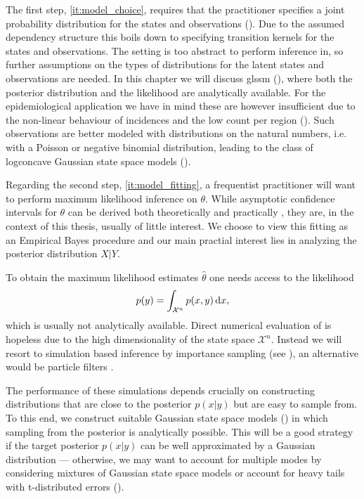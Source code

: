 The first step, \cref{it:model_choice}, requires that the practitioner specifies a joint probability distribution for the states and observations ().
Due to the assumed dependency structure this boils down to specifying transition kernels for the states and observations.
The setting  is too abstract to perform inference in, so further assumptions on the types of distributions for the latent states and observations are needed.
In this chapter we will discuss \gls{glssm}  (), where both the posterior distribution and the likelihood are analytically available. For the epidemiological application we have in mind these are however insufficient due to the non-linear behaviour of incidences and the low count per region ().
Such observations are better modeled with distributions on the natural numbers, i.e. with a Poisson or negative binomial distribution, leading to the class of logconcave Gaussian state space models ().

Regarding the second step, \cref{it:model_fitting}, a frequentist practitioner will want to perform maximum likelihood inference on $\theta$.
While asymptotic confidence intervals for $\theta$ can be derived both theoretically and practically \cite[Chapter 7]{Durbin2012Time}, they are, in the context of this thesis, usually of little interest.
We choose to view this fitting as an Empirical Bayes procedure and our main practial interest lies in analyzing the posterior distribution $X|Y$.

To obtain the maximum likelihood estimates $\hat\theta$ one needs access to the likelihood
\begin{align}
    \label{eq:likelihood}
    p(y) = \int_{\mathcal X^n} p(x,y) \,\mathrm d x,
\end{align}
which is usually not analytically available.
Direct numerical evaluation of  is hopeless due to the high dimensionality of the state space $\mathcal X^n$.
Instead we will resort to simulation based inference by importance sampling (see ), an alternative would be particle filters \cite{Chopin2020Introduction}.

The performance of these simulations depends crucially on constructing distributions that are close to the posterior $p(x|y)$ but are easy to sample from. To this end, we construct suitable Gaussian state space models () in which sampling from the posterior is analytically possible.
This will be a good strategy if the target posterior $p(x|y)$ can be well approximated by a Gaussian distribution --- otherwise, we may want to account for multiple modes by considering mixtures of Gaussian state space models or account for heavy tails with t-distributed errors ().

